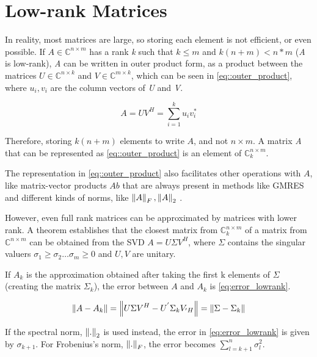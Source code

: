 
\section{Low-rank Matrices}

In reality, most matrices are large, so storing each element is not efficient, or even possible. If $A \in \mathbb{C}^{n\times m}$ has a rank \textit{k} such that $k \leq m$ and $k(n+m) < n*m$ (\textit{A} is low-rank), \textit{A} can be written in outer product form, as a product between the matrices $U \in \mathbb{C}^{n\times k} $ and $V \in \mathbb{C}^{m\times k}$, which can be seen in \ref{eq::outer_product}, where $u_{i}, v_{i}$ are the column vectors of \textit{U} and \textit{V}.

\begin{equation}\label{eq::outer_product}
    A = UV^{H} = \sum_{i=1} ^{k} u_{i} v_{i} ^{*}
\end{equation}


Therefore, storing $k(n+m)$ elements to write $A$, and not $n\times m$. A matrix \textit{A} that can be represented as \ref{eq::outer_product} is an element of $\mathbb{C}^{n\times m}_{k}$.

The representation in \ref{eq::outer_product} also facilitates other operations with $A$, like matrix-vector products $Ab$ that are always present in methods like GMRES \cite{bebendorf2008hierarchical} and different kinds of norms, like $\left\lVert A\right\rVert_{F}, \left\lVert A\right\rVert_{2}$ \cite{bebendorf2008hierarchical}.

However, even full rank matrices can be approximated by matrices with lower rank. A theorem \cite{bebendorf2008hierarchical} establishes that the closest matrix from $\mathbb{C}^{n\times m}_{k}$ of a matrix from $\mathbb{C}^{n\times m}$ can be obtained from the SVD $A = U \Sigma V^{H}$, where $\Sigma$ contains the singular valuers $\sigma_{1} \geq \sigma_{2} \dots \sigma_{m} \geq 0$ and $U,V$ are unitary.

If $ A_{k} $ is the approximation obtained after taking the first k elements of $\Sigma$ (creating the matrix $ \Sigma_{k} $), the error between $ A $ and $ A_{k} $ is \ref{eq:error_lowrank}.

\begin{equation}\label{eq:error_lowrank}
    \left\lVert A-A_{k}\right\rVert = \left\lVert U\Sigma V^{H} - U^{'} \Sigma_{k} V_{' H}\right\rVert = \left\lVert\Sigma - \Sigma_{k}\right\rVert
\end{equation}

If the spectral norm, $\left\lVert.\right\rVert_{2} $ is used instead, the error in \ref{eq:error_lowrank} is given by $\sigma_{k+1}$. For Frobenius's norm, $\left\lVert.\right\rVert_{F}$, the error becomes $\sum^{n}_{l=k+1} \sigma^{2}_{l}$.

